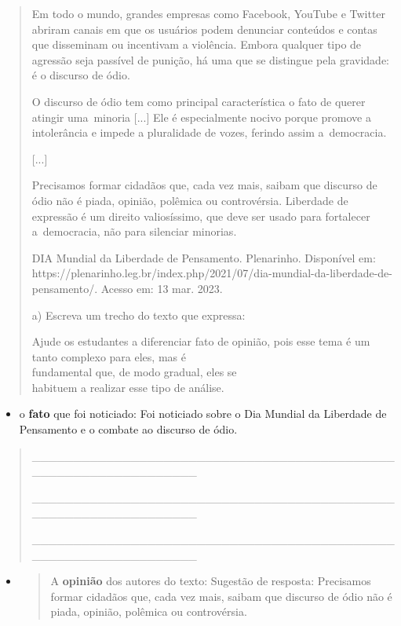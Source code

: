 \begin{itemize}
{{{\begin{itemize}
\begin{itemize}
\begin{itemize}
\begin{quote}
Em todo o mundo, grandes empresas como Facebook, YouTube e Twitter
abriram canais em que os usuários podem denunciar conteúdos e contas que
disseminam ou incentivam a violência. Embora qualquer tipo de agressão
seja passível de punição, há uma que se distingue pela gravidade: é o
discurso de ódio.

O discurso de ódio tem como principal característica o fato de querer
atingir uma~minoria {[}...{]} Ele é especialmente nocivo porque promove
a intolerância e impede a pluralidade de vozes, ferindo assim
a~democracia.

{[}...{]}

Precisamos formar cidadãos que, cada vez mais, saibam que discurso de
ódio não é piada, opinião, polêmica ou controvérsia. Liberdade de
expressão é um direito valiosíssimo, que deve ser usado para fortalecer
a~democracia, não para silenciar minorias.

DIA Mundial da Liberdade de Pensamento. Plenarinho. Disponível em:
https://plenarinho.leg.br/index.php/2021/07/dia-mundial-da-liberdade-de-pensamento/.
Acesso em: 13 mar. 2023.

a) Escreva um trecho do texto que expressa:

Ajude os estudantes a diferenciar fato de opinião, pois esse tema é um
tanto complexo para eles, mas é\\
fundamental que, de modo gradual, eles se\\
habituem a realizar esse tipo de análise.
\end{quote}

\begin{itemize}
\item
  o \textbf{fato} que foi noticiado: Foi noticiado sobre o Dia Mundial
  da Liberdade de Pensamento e o combate ao discurso de ódio.
\end{itemize}

\begin{quote}
\_\_\_\_\_\_\_\_\_\_\_\_\_\_\_\_\_\_\_\_\_\_\_\_\_\_\_\_\_\_\_\_\_\_\_\_\_\_\_\_\_\_\_\_\_\_\_\_\_\_\_\_\_\_\_\_\_\_\_\_\_\_\_\_

\_\_\_\_\_\_\_\_\_\_\_\_\_\_\_\_\_\_\_\_\_\_\_\_\_\_\_\_\_\_\_\_\_\_\_\_\_\_\_\_\_\_\_\_\_\_\_\_\_\_\_\_\_\_\_\_\_\_\_\_\_\_\_\_

\_\_\_\_\_\_\_\_\_\_\_\_\_\_\_\_\_\_\_\_\_\_\_\_\_\_\_\_\_\_\_\_\_\_\_\_\_\_\_\_\_\_\_\_\_\_\_\_\_\_\_\_\_\_\_\_\_\_\_\_\_\_\_\_
\end{quote}

\begin{itemize}
\item
  \begin{quote}
  A \textbf{opinião} dos autores do texto: Sugestão de resposta:
  Precisamos formar cidadãos que, cada vez mais, saibam que discurso de
  ódio não é piada, opinião, polêmica ou controvérsia.
  \end{quote}
\end{itemize}


\end{itemize}
\end{itemize}
\end{itemize}}}}
\end{itemize}
